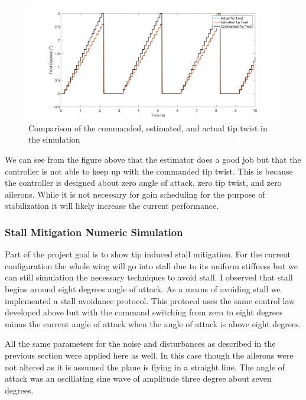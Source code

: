 \documentclass[11pt]{ucthesis}
\begin{document}
\begin{figure}[thpb]
\centering
\includegraphics[width=1\linewidth]{Figures/ProversYawTipTwist.png}
\caption{Comparison of the commanded, estimated, and actual tip twist in the simulation}
\label{fig:APcommand}
\end{figure}

We can see from the figure above that the estimator does a good job but that the controller is not able to keep up with the commanded tip twist. This is because the controller is designed about zero angle of attack, zero tip twist, and zero ailerons. While it is not necessary for gain scheduling for the purpose of stabilization it will likely increase the current performance.

\subsubsection{Stall Mitigation Numeric Simulation}
\label{sec:stallSim}
Part of the project goal is to show tip induced stall mitigation. For the current configuration the whole wing will go into stall due to its uniform stiffness but we can still simulation the necessary techniques to avoid stall. I observed that stall begins around eight degrees angle of attack. As a means of avoiding stall we implemented a stall avoidance protocol. This protocol uses the same control law developed above but with the command switching from zero to eight degrees minus the current angle of attack when the angle of attack is above eight degrees. 

All the same parameters for the noise and disturbances as described in the previous section were applied here as well. In this case though the ailerons were not altered as it is assumed the plane is flying in a straight line. The angle of attack was an oscillating sine wave of amplitude three degree about seven degrees.
\end{document}
